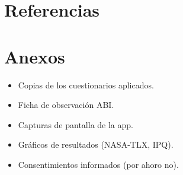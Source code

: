 \documentclass[12pt]{article}
\begin{document}
\section{Referencias} 

\section*{Anexos}
\begin{itemize}
    \item Copias de los cuestionarios aplicados.
    \item Ficha de observación ABI.
    \item Capturas de pantalla de la app.
    \item Gráficos de resultados (NASA-TLX, IPQ).
    \item Consentimientos informados (por ahoro no).
\end{itemize}
\end{document}
